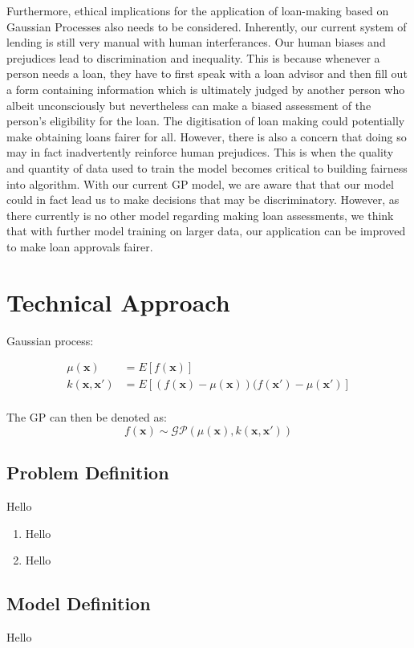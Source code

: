\documentclass[a4paper]{article}
\theoremstyle{genius}
\begin{document}
Furthermore, ethical implications for the application of loan-making based on Gaussian Processes also needs to be considered. Inherently, our current system of lending is still very manual with human interferances. Our human biases and prejudices lead to discrimination and inequality. This is because whenever a person needs a loan, they have to first speak with a loan advisor and then fill out a form containing information which is ultimately judged by another person who albeit unconsciously but nevertheless can make a biased assessment of the person’s eligibility for the loan. The digitisation of loan making could potentially make obtaining loans fairer for all. However, there is also a concern that doing so may in fact inadvertently reinforce human prejudices. This is when the quality and quantity of data used to train the model becomes critical to building fairness into algorithm. With our current GP model, we are aware that that our model could in fact lead us to make decisions that may be discriminatory. However, as there currently is no other model regarding making loan assessments, we think that with further model training on larger data, our application can be improved to make loan approvals fairer.  

\section{Technical Approach}
Gaussian process:

\begin{align*}
	\mu(\textbf{x}) &= E[f(\textbf{x})] \\
	k(\textbf{x}, \textbf{x}') &= E[(f(\textbf{x}) - \mu(\textbf{x}))(f(\textbf{x}') - \mu(\textbf{x}')] \\
\end{align*}

The GP can then be denoted as:
\[f(\textbf{x}) \sim \mathcal{GP}(\mu(\textbf{x}), k(\textbf{x}, \textbf{x}'))\]

\subsection{Problem Definition}
Hello

\begin{enumerate}
	\item Hello
	\item Hello
\end{enumerate}

\subsection{Model Definition}
Hello
\end{document}
